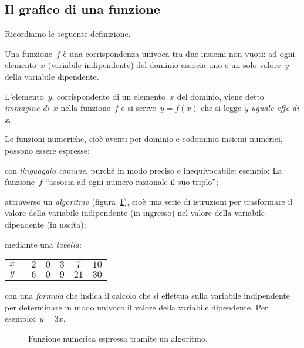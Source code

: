 
\subsection{Il grafico di una funzione}
\label{subsec:fun_grafico}

Ricordiamo le seguente definizione.
\begin{definizione}
 Una funzione~$f$ è una corrispondenza univoca tra due insiemi non vuoti: ad 
ogni elemento~$x$ (variabile indipendente)
del dominio associa uno e un solo valore~$y$ della variabile dipendente.

 L'elemento~$y$, corrispondente di un elemento~$x$ del dominio, viene detto 
\emph{immagine di}~$x$ nella funzione~$f$ e si scrive~$y=f(x)$ che si legge 
\emph{y uguale effe di x}.
\end{definizione}
Le funzioni numeriche, cioè aventi per dominio e codominio insiemi numerici, 
possono essere espresse:
\begin{itemize*}
\item con \emph{linguaggio comune}, purché in modo preciso e inequivocabile: 
esempio: La funzione~$f$
 ``associa ad ogni numero razionale il suo triplo'';
\item attraverso un \emph{algoritmo} (figura~\ref{fig:D.19}), cioè una serie di 
istruzioni per trasformare il valore della variabile indipendente
 (in ingresso) nel valore della variabile dipendente (in uscita);
\item mediante una \emph{tabella}:
 \begin{center}
\begin{tabular}{cccccc}
 \toprule
 $x$ & $-2$ & $0$ & $3$ & $7$ & $10$ \\
 $y$ & $-6$ & $0$ & $9$ & $21$ & $30$\\
 \bottomrule
 \end{tabular}
 \end{center}
\item con una \emph{formula} che indica il calcolo che si effettua sulla 
variabile indipendente per determinare in modo univoco
il valore della variabile dipendente. Per esempio:~$y=3x$.
\end{itemize*}

\begin{inaccessibleblock}
 \begin{figure}[b]
\centering
\caption{Funzione numerica espressa tramite un algoritmo.}\label{fig:D.19}
\end{figure}
\end{inaccessibleblock}


